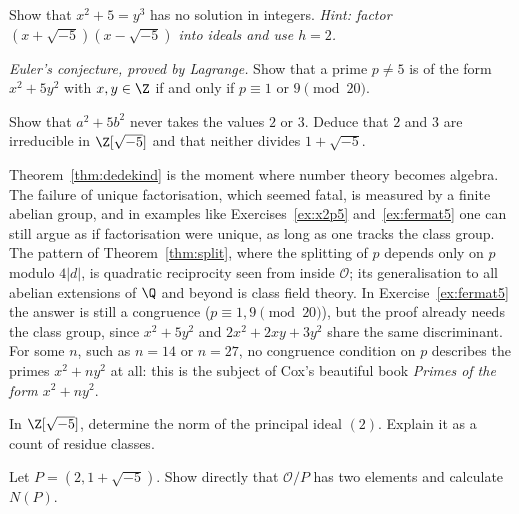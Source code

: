 \begin{exercise}[$\star\star\star$]\label{ex:x2p5}
Show that $x^2+5=y^3$ has no solution in integers. \emph{Hint: factor $(x+\sqrt{-5})(x-\sqrt{-5})$ into ideals and use $h=2$.}
\end{exercise}

\begin{exercise}[$\star\star\star$]\label{ex:fermat5}
\emph{Euler's conjecture, proved by Lagrange.} Show that a prime $p\ne5$ is of the form $x^2+5y^2$ with $x,y\in\Z$ if and only if $p\equiv1$ or $9\pmod{20}$.
\end{exercise}

\begin{exercise}[$\star\star$]\label{ex:t1-no-norm}
Show that $a^2+5b^2$ never takes the values $2$ or $3$. Deduce that $2$ and $3$ are irreducible in $\Z[\sqrt{-5}]$ and that neither divides $1+\sqrt{-5}$.
\end{exercise}

\begin{beauty}
Theorem~\ref{thm:dedekind} is the moment where number theory becomes algebra. The failure of unique factorisation, which seemed fatal, is measured by a finite abelian group, and in examples like Exercises~\ref{ex:x2p5} and~\ref{ex:fermat5} one can still argue as if factorisation were unique, as long as one tracks the class group. The pattern of Theorem~\ref{thm:split}, where the splitting of $p$ depends only on $p$ modulo $4|d|$, is quadratic reciprocity seen from inside $\mathcal O$; its generalisation to all abelian extensions of $\Q$ and beyond is class field theory. In Exercise~\ref{ex:fermat5} the answer is still a congruence ($p\equiv1,9\pmod{20}$), but the proof already needs the class group, since $x^2+5y^2$ and $2x^2+2xy+3y^2$ share the same discriminant. For some $n$, such as $n=14$ or $n=27$, no congruence condition on $p$ describes the primes $x^2+ny^2$ at all: this is the subject of Cox's beautiful book \emph{Primes of the form $x^2+ny^2$}.
\end{beauty}

\begin{exercise}[$\star$]\label{ex:v13-extra-02-1}
In $\Z[\sqrt{-5}]$, determine the norm of the principal ideal $(2)$. Explain it as a count of residue classes.
\end{exercise}

\begin{exercise}[$\star$]\label{ex:v13-extra-02-2}
Let $P=(2,1+\sqrt{-5})$. Show directly that $\mathcal O/P$ has two elements and calculate $N(P)$.
\end{exercise}

